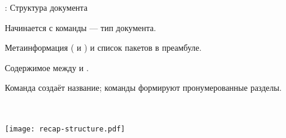 \documentclass[usenames,dvipsnames]{beamer}
\begin{document}
\begin{frame}[fragile]{\insertsection: Структура документа}
\vspace{-3ex}
\begin{itemize}{\small
\item Начинается с команды  --- тип документа.
\item Метаинформация ( и ) и список пакетов в преамбуле.
\item Содержимое между  и .
\item Команда  создаёт название; команды 
формируют пронумерованные разделы.
}\end{itemize}
\vspace{-4ex}
\begin{minipage}{0.55\linewidth}
\end{minipage}~~%
\begin{minipage}{0.45\linewidth}
\texttt{[image: recap-structure.pdf]}
\end{minipage}
\end{frame}
\end{document}
